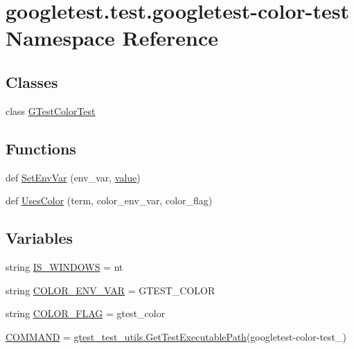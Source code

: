 \hypertarget{namespacegoogletest_1_1test_1_1googletest-color-test}{}\section{googletest.\+test.\+googletest-\/color-\/test Namespace Reference}
\label{namespacegoogletest_1_1test_1_1googletest-color-test}
\subsection*{Classes}
\begin{DoxyCompactItemize}
\item 
class \mbox{\hyperlink{classgoogletest_1_1test_1_1googletest-color-test_1_1_g_test_color_test}{G\+Test\+Color\+Test}}
\end{DoxyCompactItemize}
\subsection*{Functions}
\begin{DoxyCompactItemize}
\item 
def \mbox{\hyperlink{namespacegoogletest_1_1test_1_1googletest-color-test_ae62a6ab0c9dffae195d3ab9ee25a6ef0}{Set\+Env\+Var}} (env\+\_\+var, \mbox{\hyperlink{_obj__test_2lib_2googletest-master_2googlemock_2test_2gmock-matchers__test_8cc_a337b8a670efc0b086ad3af163f3121b6}{value}})
\item 
def \mbox{\hyperlink{namespacegoogletest_1_1test_1_1googletest-color-test_a1f9347a704ca27f7102ab14900796ab1}{Uses\+Color}} (term, color\+\_\+env\+\_\+var, color\+\_\+flag)
\end{DoxyCompactItemize}
\subsection*{Variables}
\begin{DoxyCompactItemize}
\item 
string \mbox{\hyperlink{namespacegoogletest_1_1test_1_1googletest-color-test_aef34789d18e129ea821954804d8b3d3f}{I\+S\+\_\+\+W\+I\+N\+D\+O\+WS}} = \textquotesingle{}nt\textquotesingle{}
\item 
string \mbox{\hyperlink{namespacegoogletest_1_1test_1_1googletest-color-test_a72dac9111105e74798e92748fa64fb67}{C\+O\+L\+O\+R\+\_\+\+E\+N\+V\+\_\+\+V\+AR}} = \textquotesingle{}G\+T\+E\+S\+T\+\_\+\+C\+O\+L\+OR\textquotesingle{}
\item 
string \mbox{\hyperlink{namespacegoogletest_1_1test_1_1googletest-color-test_a615e9e15eb62797875259a25fbe2d53c}{C\+O\+L\+O\+R\+\_\+\+F\+L\+AG}} = \textquotesingle{}gtest\+\_\+color\textquotesingle{}
\item 
\mbox{\hyperlink{namespacegoogletest_1_1test_1_1googletest-color-test_a4199007cdd1201fbacf3901e07c54930}{C\+O\+M\+M\+A\+ND}} = \mbox{\hyperlink{namespacegoogletest_1_1test_1_1gtest__test__utils_ac9af888c702350aac56b154a6af34098}{gtest\+\_\+test\+\_\+utils.\+Get\+Test\+Executable\+Path}}(\textquotesingle{}googletest-\/color-\/test\+\_\+\textquotesingle{})
\end{DoxyCompactItemize}



